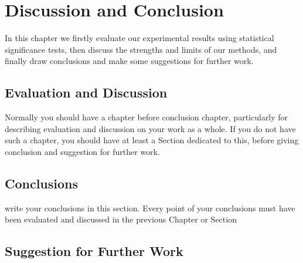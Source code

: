 \def\baselinestretch{1}

\chapter{Discussion and Conclusion}

\def\baselinestretch{1.66}


In this chapter we firstly evaluate our experimental results using statistical significance tests, then discuss the strengths and limits of our methods, and finally  draw conclusions and make some suggestions for further work. 

\goodbreak
\section{Evaluation and Discussion}

Normally you should have a chapter before conclusion chapter, particularly for describing evaluation and discussion on your work as a whole. If you do not have such a chapter, you should have at least a Section dedicated to this, before giving conclusion and suggestion for further work.


\goodbreak
\section{Conclusions}

write your conclusions in this section.
Every point of your conclusions must have been evaluated and discussed in the previous Chapter or Section 

\goodbreak
\section{Suggestion for Further Work}

